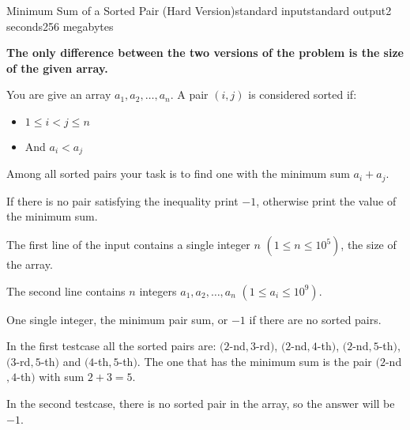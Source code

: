 \begin{problem}{Minimum Sum of a Sorted Pair (Hard Version)}{standard input}{standard output}{2 seconds}{256 megabytes}

\textbf{The only difference between the two versions of the problem is the size of the given array.}

You are give an array $a_1, a_2, \dots, a_n$. A pair $(i,j)$ is considered sorted if:

\begin{itemize}
  \item $1 \leq i < j \leq n$
  \item And $a_i < a_j$
\end{itemize}

Among all sorted pairs your task is to find one with the minimum sum $a_i + a_j$.

If there is no pair satisfying the inequality print $-1$, otherwise print the value of the minimum sum.

\InputFile
The first line of the input contains a single integer $n$ $(1 \leq n \leq 10^5)$, the size of the array.

The second line contains $n$ integers $a_1, a_2, \dots, a_n$ $(1\leq a_i \leq 10^9)$.

\OutputFile
One single integer, the minimum pair sum, or $-1$ if there are no sorted pairs.

\Examples

\begin{example}
%
%
\end{example}

\Note
In the first testcase all the sorted pairs are: $(2$-nd$,3$-rd$)$, $(2$-nd$,4$-th$)$, $(2$-nd$,5$-th$)$, $(3$-rd$,5$-th$)$ and $(4$-th$,5$-th$)$. The one that has the minimum sum is the pair $(2$-nd$,4$-th$)$ with sum $2+3=5$.

In the second testcase, there is no sorted pair in the array, so the answer will be $-1$.

\end{problem}

